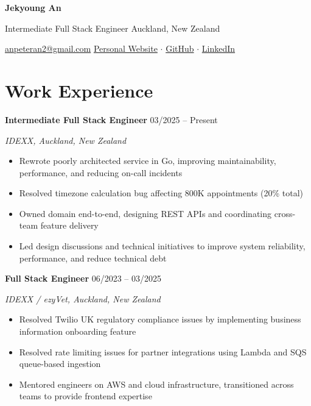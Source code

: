\documentclass[11pt,a4paper]{article}
\begin{document}
{\LARGE \textbf{Jekyoung An}}

\vspace{0.3em}

{\large Intermediate Full Stack Engineer} \hfill Auckland, New Zealand

\vspace{0.5em}

\href{mailto:anpeteran2@gmail.com}{anpeteran2@gmail.com}
\hfill \href{https://exoticasoftware.dev}{Personal Website} $\cdot$
\href{https://github.com/Exotica0122}{GitHub} $\cdot$
\href{https://linkedin.com/in/peteransoftware}{LinkedIn}

\section*{Work Experience}

\textbf{Intermediate Full Stack Engineer} \hfill 03/2025 -- Present

\textit{IDEXX, Auckland, New Zealand}

\begin{itemize}[leftmargin=1.5em, itemsep=0.2em]
    \item Rewrote poorly architected service in Go, improving maintainability, performance, and reducing on-call incidents
    \item Resolved timezone calculation bug affecting 800K appointments (20\% total)
    \item Owned domain end-to-end, designing REST APIs and coordinating cross-team feature delivery
    \item Led design discussions and technical initiatives to improve system reliability, performance, and reduce technical debt
\end{itemize}

\textbf{Full Stack Engineer} \hfill 06/2023 -- 03/2025

\textit{IDEXX / ezyVet, Auckland, New Zealand}

\begin{itemize}[leftmargin=1.5em, itemsep=0.2em]
    \item Resolved Twilio UK regulatory compliance issues by implementing business information onboarding feature
    \item Resolved rate limiting issues for partner integrations using Lambda and SQS queue-based ingestion
    \item Mentored engineers on AWS and cloud infrastructure, transitioned across teams to provide frontend expertise
\end{itemize}
\end{document}
